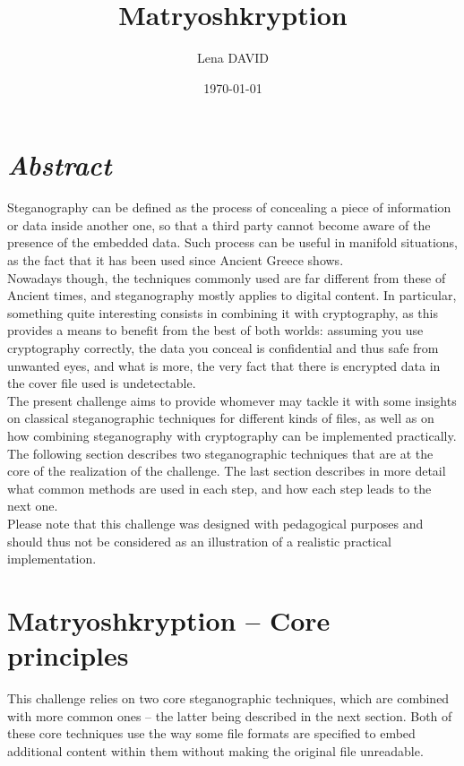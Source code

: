 \documentclass[12pt,a4paper]{article}
\author{Lena DAVID}
\title{Matryoshkryption}
\date{\today}
\begin{document}
\maketitle
\vspace{4em}

\section*{\textit{Abstract}}
    Steganography can be defined as the process of concealing a piece of
    information or data inside another one, so that a third party cannot become
    aware of the presence of the embedded data. Such process can be useful in
    manifold situations, as the fact that it has been used since Ancient Greece
    shows.\\
    \indent Nowadays though, the techniques commonly used are far different
    from these of Ancient times, and steganography mostly applies to digital
    content. In particular, something quite interesting consists in combining
    it with cryptography, as this provides a means to benefit from the best of
    both worlds: assuming you use cryptography correctly, the data you conceal
    is confidential and thus safe from unwanted eyes, and what is more, the
    very fact that there is encrypted data in the cover file used is
    undetectable.\\
    \indent The present challenge aims to provide whomever may tackle it with some
    insights on classical steganographic techniques for different kinds of
    files, as well as on how combining steganography with cryptography can be
    implemented practically.\\

    The following section describes two steganographic techniques that are at
    the core of the realization of the challenge. The last section describes
    in more detail what common methods are used in each step, and how each step
    leads to the next one.\\

    Please note that this challenge was designed with pedagogical purposes and
    should thus not be considered as an illustration of a realistic practical
    implementation.

\section*{Matryoshkryption -- Core principles}
    This challenge relies on two core steganographic techniques, which are
    combined with more common ones -- the latter being described in the next
    section. Both of these core techniques use the way some file formats are
    specified to embed additional content within them without making the
    original file unreadable.\\
\end{document}
